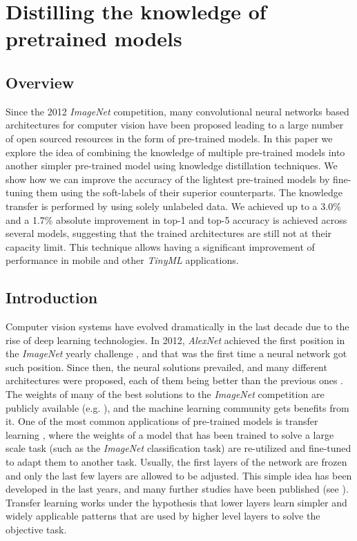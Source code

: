 \chapter{Distilling the knowledge of pretrained models} \label{ch:distillation}
\section{Overview}
Since the 2012 \textit{ImageNet} competition, many convolutional neural networks based architectures for computer vision have been proposed leading to a large number of open sourced resources in the form of pre-trained models. In this paper we explore the idea of combining the knowledge of multiple pre-trained models into another simpler pre-trained model using knowledge distillation techniques. We show how we can improve the accuracy of the lightest pre-trained models by fine-tuning them using the soft-labels of their superior counterparts. The knowledge transfer is performed by using solely unlabeled data. We achieved up to a 3.0\% and a 1.7\% absolute improvement in top-1 and top-5 accuracy is achieved across several models, suggesting that the trained architectures are still not at their capacity limit. This technique allows having a significant improvement of performance in mobile and other \textit{TinyML} applications. 


\section{Introduction}
Computer vision systems have evolved dramatically in the last decade due to the rise of deep learning technologies. In 2012, \textit{AlexNet} \cite{krizhevsky2012} achieved the first position in the \textit{ImageNet} yearly challenge \cite{ILSVRC15}, and that was the first time a neural network got such position. Since then, the neural solutions prevailed, and many different architectures were proposed, each of them being better than the previous ones \cite{khan2020, algan2021}. The weights of many of the best solutions to the \textit{ImageNet} competition are publicly available (e.g. \cite{he2016, chollet2017, szegedy2016, szegedy2017, howard2017, pham2018, tan2019}), and the machine learning community gets benefits from it. One of the most common applications of pre-trained models is transfer learning \cite{huang2021}, where the weights of a model that has been trained to solve a large scale task (such as the \textit{ImageNet} classification task) are re-utilized and fine-tuned to adapt them to another task. Usually, the first layers of the network are frozen and only the last few layers are allowed to be adjusted. This simple idea has been developed in the last years, and many further studies have been published (see \cite{zhu2018, wu2021, pzhao2021}). Transfer learning works under the hypothesis that lower layers learn simpler and widely applicable patterns that are used by higher level layers to solve the objective task.

